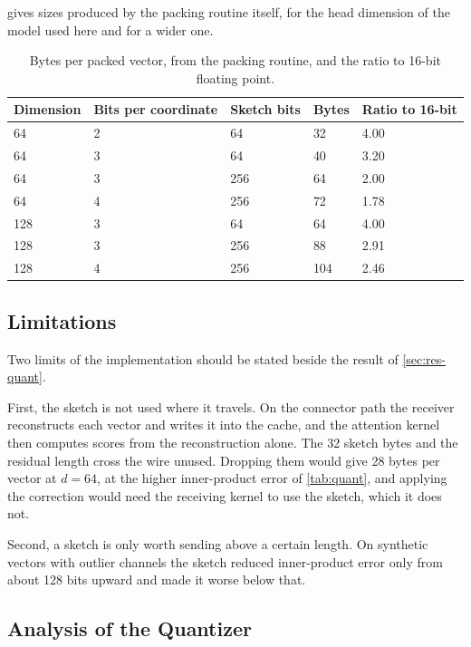  gives sizes produced by the packing routine itself, for the
head dimension of the model used here and for a wider one.

\begin{table}[htbp]
  \centering
  \caption[Bytes per packed vector and the ratio to 16-bit floating point]{Bytes per packed vector, from the packing routine, and the ratio to 16-bit floating point.}
  \label{tab:packed}
  \small
  \begin{tabular}{L{2.6cm}L{3.0cm}L{3.0cm}L{2.4cm}L{2.4cm}}
    \toprule
    Dimension & Bits per coordinate & Sketch bits & Bytes & Ratio to 16-bit \\
     & 2 & 64 & 32 & 4.00 \\
    64 & 3 & 64 & 40 & 3.20 \\
    64 & 3 & 256 & 64 & 2.00 \\
    64 & 4 & 256 & 72 & 1.78 \\
    128 & 3 & 64 & 64 & 4.00 \\
    128 & 3 & 256 & 88 & 2.91 \\
    128 & 4 & 256 & 104 & 2.46 \\
    \bottomrule
  \end{tabular}
\end{table}

\subsection{Limitations}

Two limits of the implementation should be stated beside the result of
\cref{sec:res-quant}.

First, the sketch is not used where it travels. On the connector path the
receiver reconstructs each vector and writes it into the cache, and the
attention kernel then computes scores from the reconstruction alone. The 32
sketch bytes and the residual length cross the wire unused. Dropping them
would give 28 bytes per vector at $d = 64$, at the higher inner-product
error of \cref{tab:quant}, and applying the correction would need the
receiving kernel to use the sketch, which it does not.

Second, a sketch is only worth sending above a certain length. On synthetic
vectors with outlier channels the sketch reduced inner-product error only
from about 128 bits upward and made it worse below that.

\subsection{Analysis of the Quantizer}
\label{sec:proofs-quant}

